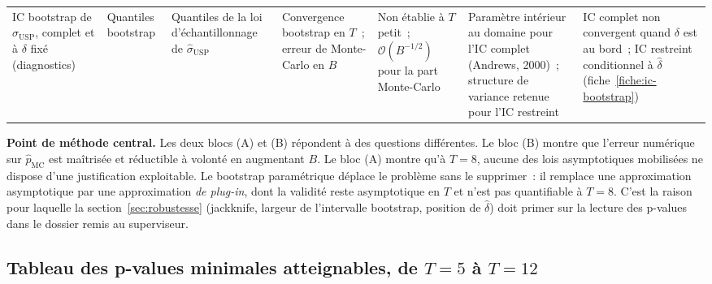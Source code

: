 \documentclass[a4paper,11pt]{article}
\begin{document}
\begin{landscape}
\begin{center}
\begin{longtable}{@{}p{2.7cm}p{3.4cm}p{2.6cm}p{2.5cm}p{3.5cm}p{3.0cm}p{3.6cm}@{}}
IC bootstrap de $\sigma_{\mathrm{USP}}$, complet et à $\delta$ fixé (diagnostics) & Quantiles
bootstrap & Quantiles de la loi d'échantillonnage de $\hat\sigma_{\mathrm{USP}}$ &
Convergence bootstrap en $T$~; erreur de Monte-Carlo en $B$ &
Non établie à $T$ petit~; $\mathcal{O}(B^{-1/2})$ pour la part Monte-Carlo &
Paramètre intérieur au domaine pour l'IC complet (Andrews, 2000)~; structure de variance
retenue pour l'IC restreint &
IC complet non convergent quand $\delta$ est au bord~; IC restreint conditionnel à
$\hat\delta$ (fiche~\ref{fiche:ic-bootstrap}) \\

\end{longtable}
\end{center}
\end{landscape}

\medskip
\begin{encadre}
\textbf{Point de méthode central.} Les deux blocs (A) et (B) répondent à des
questions différentes. Le bloc (B) montre que l'erreur numérique sur
$\hat p_{\text{MC}}$ est maîtrisée et réductible à volonté en augmentant $B$. Le
bloc (A) montre qu'à $T = 8$, aucune des lois asymptotiques mobilisées ne
dispose d'une justification exploitable. Le bootstrap paramétrique déplace le
problème sans le supprimer~: il remplace une approximation asymptotique par une
approximation \emph{de plug-in}, dont la validité reste asymptotique en $T$ et
n'est pas quantifiable à $T = 8$. C'est la raison pour laquelle la
section~\ref{sec:robustesse} (jackknife, largeur de l'intervalle bootstrap,
position de $\hat\delta$) doit primer sur la lecture des p-values dans le
dossier remis au superviseur.
\end{encadre}

\subsection{Tableau des p-values minimales atteignables, de $T = 5$ à $T = 12$}
\label{tab:pmin}
\end{document}
